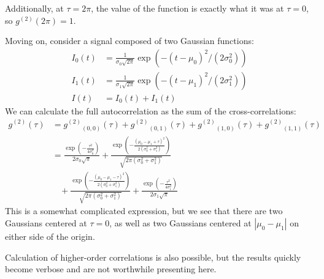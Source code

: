 \documentclass{article}
\newcommand{\gn}[1]{\ensuremath{g^{(#1)}}}
\newcommand{\abs}[1]{\ensuremath{\left|#1\right|}}
\begin{document}
Additionally, at $\tau=2\pi$, the value of the function is exactly what it was at $\tau=0$, so $\gn{2}(2\pi)=1$.

Moving on, consider a signal composed of two Gaussian functions:
\begin{align}
I_{0}(t) &= \frac{1}{\sigma_{0}\sqrt{2\pi}}\exp{\left(-(t-\mu_{0})^{2}/(2\sigma_{0}^{2})\right)} \\
I_{1}(t) &= \frac{1}{\sigma_{1}\sqrt{2\pi}}\exp{\left(-(t-\mu_{1})^{2}/(2\sigma_{1}^{2})\right)} \\
I(t) &= I_{0}(t)+I_{1}(t)
\end{align}
We can calculate the full autocorrelation as the sum of the cross-correlations:
\begin{align}
\gn{2}(\tau) &= \gn{2}_{(0,0)}(\tau)+\gn{2}_{(0,1)}(\tau)+\gn{2}_{(1,0)}(\tau)+\gn{2}_{(1,1)}(\tau) \\
             &= \frac{\exp{\left(-\frac{\tau^{2}}{4\sigma_{0}^2}\right)}}{2\sigma_{0}\sqrt{\pi}}
                + \frac{\exp{\left(-\frac{(\mu_{0}-\mu_{1}+\tau)^{2}}{2(\sigma_{0}^{2}+\sigma_{1}^{2})}\right)}}
                        {\sqrt{2\pi(\sigma_{0}^{2}+\sigma_{1}^{2})}} \nonumber \\
                &~~~~+ \frac{\exp{\left(-\frac{(\mu_{0}-\mu_{1}-\tau)^{2}}{2(\sigma_{0}^{2}+\sigma_{1}^{2})}\right)}}
                        {\sqrt{2\pi(\sigma_{0}^{2}+\sigma_{1}^{2})}}
                +
                \frac{\exp{\left(-\frac{\tau^{2}}{4\sigma_{1}^2}\right)}}{2\sigma_{1}\sqrt{\pi}}
\end{align}
This is a somewhat complicated expression, but we see that there are two Gaussians centered at $\tau=0$, as well as two Gaussians centered at $\abs{\mu_{0}-\mu_{1}}$ on either side of the origin. 

Calculation of higher-order correlations is also possible, but the results quickly become verbose and are not worthwhile presenting here.
\end{document}

